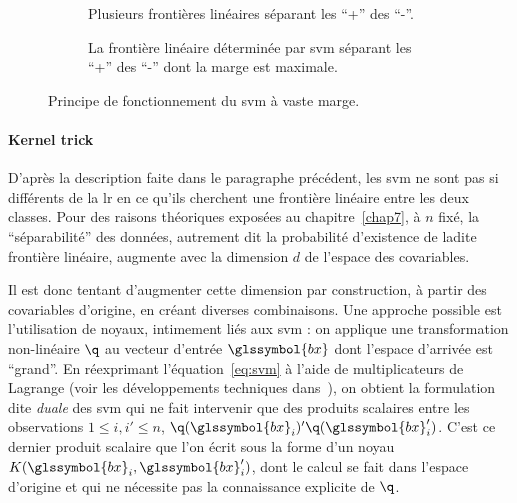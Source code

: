 
\begin{figure}[!htb]
{\setlength{\parindent}{0cm}}
\begin{multicols}{2}
    \centering
    \begin{subfigure}[t]{0.45\textwidth}
        \centering
        
        \caption[SVM blabla.]{\label{fig:svm1} Plusieurs frontières linéaires séparant les ``+'' des ``-''.\protect\footnotemark[1]}
    \end{subfigure}%
    \columnbreak
    \hspace*{1cm} \begin{subfigure}[t]{0.45\textwidth}
        \centering
        
        \caption[SVM blablabla.]{\label{fig:svm2} La frontière linéaire déterminée par \gls{svm} séparant les ``+'' des ``-'' dont la marge est maximale.\protect\footnotemark[1]}
    \end{subfigure}
\end{multicols}
\caption{\label{fig:svm} Principe de fonctionnement du \gls{svm} à vaste marge.}
\end{figure}



\paragraph{Kernel trick}

D'après la description faite dans le paragraphe précédent, les \gls{svm} ne sont pas si différents de la \gls{lr} en ce qu'ils cherchent une frontière linéaire entre les deux classes. Pour des raisons théoriques exposées au chapitre~\ref{chap7}, à $n$ fixé, la ``séparabilité'' des données, autrement dit la probabilité d'existence de ladite frontière linéaire, augmente avec la dimension $d$ de l'espace des covariables.

Il est donc tentant d'augmenter cette dimension par construction, à partir des covariables d'origine, en créant diverses combinaisons. Une approche possible est l'utilisation de noyaux, intimement liés aux \gls{svm} : on applique une transformation non-linéaire $\q$ au vecteur d'entrée $\glssymbol{bx}$ dont l'espace d'arrivée est ``grand''. En réexprimant l'équation~\ref{eq:svm} à l'aide de multiplicateurs de Lagrange (voir les développements techniques dans~\cite{scholkopf2002learning}), on obtient la formulation dite \textit{duale} des \gls{svm} qui ne fait intervenir que des produits scalaires entre les observations $1 \leq i,i' \leq n$, $\q(\glssymbol{bx}_i)' \q(\glssymbol{bx}_i')$. C'est ce dernier produit scalaire que l'on écrit sous la forme d'un noyau $K(\glssymbol{bx}_i,\glssymbol{bx}_i')$, dont le calcul se fait dans l'espace d'origine et qui ne nécessite pas la connaissance explicite de $\q$.

